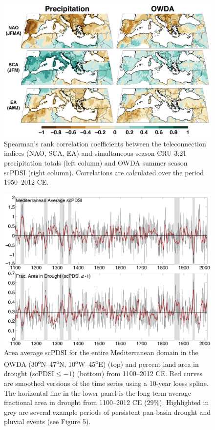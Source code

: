 \documentclass[draft,jgr]{AGUTeX}
\begin{document}
\begin{figure}
\center
\includegraphics[width=1.0\columnwidth]{fig_03_teleconn_corr_MED1.png}
\caption{Spearman's rank correlation coefficients between the teleconnection indices (NAO, SCA, EA) and simultaneous season CRU 3.21 precipitation totals (left column) and OWDA summer season scPDSI (right column). Correlations are calculated over the period 1950--2012 CE.}\label{placeholder}
\end{figure}

\begin{figure}
\center
\includegraphics[width=1.0\columnwidth]{fig_04_ave_area_pdsi_MED1.png}
\caption{Area average scPDSI for the entire Mediterranean domain in the OWDA (30\textsuperscript{o}N--47\textsuperscript{o}N, 10\textsuperscript{o}W--45\textsuperscript{o}E) (top) and percent land area in drought (scPDSI$\le-1$) (bottom) from 1100--2012 CE. Red curves are smoothed versions of the time series using a 10-year loess spline. The horizontal line in the lower panel is the long-term average fractional area in drought from 1100--2012 CE (29\%). Highlighted in grey are several example periods of persistent pan-basin drought and pluvial events (see Figure 5).}\label{placeholder}
\end{figure}
\end{document}
